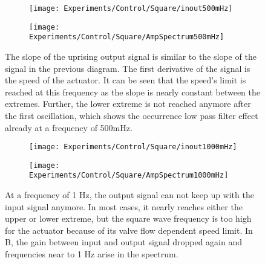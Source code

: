 \documentclass[main]{subfiles}
\begin{document}
\begin{figure}[H]
\begin{adjustwidth}{-8em}{-3em}
\begin{subfigure}[t]{0.665\textwidth}
\texttt{[image: Experiments/Control/Square/inout500mHz]}
\end{subfigure}\hspace{0.05\textwidth}
\begin{subfigure}[t]{0.6\textwidth}
\texttt{[image: Experiments/Control/Square/AmpSpectrum500mHz]}
\end{subfigure}
\end{adjustwidth}

\caption[Square wave control signal at 500mHz]{The slope of the uprising output signal is similar to the slope of the signal in the previous diagram. The first derivative of the signal is the speed of the actuator. It can be seen that the speed's limit is reached at this frequency as the slope is nearly constant between the extremes. Further, the lower extreme is not reached anymore after the first oscillation, which shows the occurrence low pass filter effect already at a frequency of 500mHz.}
\label{sq-500mHz}
\end{figure}

\begin{figure}[H]
\begin{adjustwidth}{-8em}{-3em}
\begin{subfigure}[t]{0.665\textwidth}
\texttt{[image: Experiments/Control/Square/inout1000mHz]}
\end{subfigure}\hspace{0.05\textwidth}
\begin{subfigure}[t]{0.6\textwidth}
\texttt{[image: Experiments/Control/Square/AmpSpectrum1000mHz]}
\end{subfigure}
\end{adjustwidth}

\caption[Square wave control signal at 1 Hz]{At a frequency of 1 Hz, the output signal can not keep up with the input signal anymore. In most cases, it nearly reaches either the upper or lower extreme, but the square wave frequency is too high for the actuator because of its valve flow dependent speed limit. In B, the gain between input and output signal dropped again and frequencies near to 1 Hz arise in the spectrum.}
\label{sq-1000mHz}
\end{figure}
\end{document}
